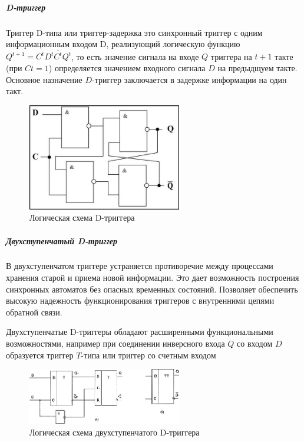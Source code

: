 \documentclass{article}
\begin{document}
\begin{flushleft}
\pagebreak
\subparagraph{D-триггер}

Триггер D-типа или триггер-задержка это синхронный триггер с одним информационным входом D, реализующий логическую функцию $Q^{t + 1} = C^{t} D^{t} \overline{C^{t}} Q^{t}$, то есть значение сигнала на входе $Q$ триггера на $t + 1$ такте (при $Ct = 1$) определяется значением входного сигнала $D$ на предыдщуем такте. Основное назначение $D$-триггер заключается в задержке информации на один такт.

\begin{figure}
\caption{Логическая схема D-триггера}
\includegraphics[width=0.6\textwidth]{assets/d_trigger.jpg}
\end{figure}

\subparagraph{Двухступенчатый D-триггер}

В двухступенчатом триггере устраняется противоречие между процессами хранения старой и приема новой информации. Это дает возможность построения синхронных автоматов без опасных временных состояний. Позволяет обеспечить высокую надежность функционирования триггеров с внутренними цепями обратной связи.

Двухступенчатые D-триггеры обладают расширенными функциональными возможностями, например при соединении инверсного входа $Q$ со входом $D$ образуется триггер $T$-типа или триггер со счетным входом

\begin{figure}
\caption{Логическая схема двухступенчатого D-триггера}
\includegraphics[width=0.6\textwidth]{assets/two_stage_d_trigger.png}
\end{figure}


\end{flushleft}
\end{document}
